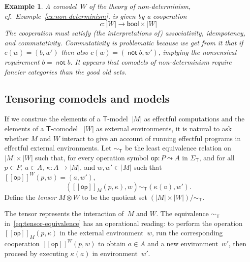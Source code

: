 \documentclass{amsart}
\newcommand{\theory}[1]{\mathsf{#1}} %
\newcommand{\signature}[1]{\Sigma_{\theory{#1}}} %
\newcommand{\carrier}[1]{|#1|} %
\newcommand{\opdecl}[3]{#1 : #2 \leadsto #3} %
\newcommand{\sem}[1]{[\![#1]\!]} %
\newcommand{\bool}{\mathsf{bool}} %
\newcommand{\tensor}[2]{#1 \otimes #2} %
\newcommand{\kode}[1]{\mathsf{#1}}
\newtheorem{example}{Example}[section]
\begin{document}
\begin{example}
  A comodel~$W$ of the theory of non-determinism, cf.\
  Example~\ref{ex:non-determinism}, is given by a cooperation
  \begin{equation*}
    c : \carrier{W} \to \bool \times \carrier{W}
  \end{equation*}
  The cooperation must satisfy (the interpretations of) associativity,
  idempotency, and commutativity. Commutativity is problematic because we get
  from it that if $c(w) = (b, w')$ then also
  $c(w) = (\mathop{\mathsf{not}} b, w')$, implying the nonsensical requirement
  $b = \mathop{\mathsf{not}} b$. It appears that comodels of non-determinism require
  fancier categories than the good old sets.
\end{example}

\subsection{Tensoring comodels and models}
\label{sec:tens-comod-models}


If we construe the elements of a $\theory{T}$-model~$\carrier{M}$ as effectful
computations and the elements of a $\theory{T}$-comodel ~$\carrier{W}$ as
external environments, it is natural to ask whether $M$ and $W$ interact to give
an account of running effectful programs in effectful external environments.
%
Let $\sim_\theory{T}$ be the least equivalence relation
on~$\carrier{M} \times \carrier{W}$ such that, for every operation symbol
$\opdecl{\kode{op}}{P}{A}$ in $\signature{T}$, and for all $p \in P$, $a \in A$,
$\kappa : A \to \carrier{M}$, and $w, w' \in \carrier{M}$ such that
$\sem{\kode{op}}^W(p, w) = (a, w')$,
%
\begin{equation}
  \label{eq:tensor-equivalence}
  (\sem{\kode{op}}_M(p, \kappa), w) \sim_\theory{T} (\kappa(a), w').
\end{equation}
%
Define the \emph{tensor $\tensor{M}{W}$} to be the quotient set
$(\carrier{M} \times \carrier{W})/{\sim_\theory{T}}$.

The tensor represents the interaction of~$M$ and $W$. The equivalence
$\sim_\theory{T}$ in~\eqref{eq:tensor-equivalence} has an operational reading:
to perform the operation $\sem{\kode{op}}_M(p, \kappa)$ in the external
environment~$w$, run the corresponding cooperation $\sem{\kode{op}}^W(p, w)$ to
obtain $a \in A$ and a new environment~$w'$, then proceed by executing
$\kappa(a)$ in environment~$w'$.
\end{document}
